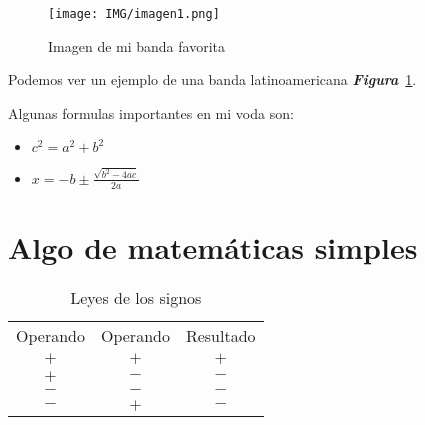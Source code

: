 
\begin{figure}[h]
  \centering
  \texttt{[image: IMG/imagen1.png]}
  \caption{Imagen de mi banda favorita}
  \label{fig:Soda}
\end{figure}

Podemos ver un ejemplo de una banda latinoamericana \textbf{\textbf{\emph{Figura}}}~\ref{fig:Soda}.

\newpage
Algunas formulas importantes en mi voda son:
\begin{itemize}
\item $c^2 = a^2 + b^2$
\item $x=-b \pm \frac{\sqrt{b^2-4ac}}{2a}$
\end{itemize}  
  
\section{Algo de matemáticas simples}

\begin{table}[h]
  \centering
  \begin{tabular} {| c c c |}
    \hline
    Operando & Operando & Resultado\\
    $+$ & $+$ & $+$\\
    $+$ & $-$ & $-$\\
    $-$ & $-$ & $-$\\
    $-$ & $+$ & $-$\\
    \hline
  \end{tabular}
  \caption{Leyes de los signos}
  \end{table}
